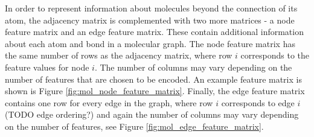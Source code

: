 In order to represent information about molecules beyond the connection of its atom, the adjacency matrix is complemented with two more matrices - a node feature matrix and an edge feature matrix. These contain additional information about each atom and bond in a molecular graph. The node feature matrix has the same number of rows as the adjacency matrix, where row $i$ corresponds to the feature values for node $i$. The number of columns may vary depending on the number of features that are chosen to be encoded. An example feature matrix is shown is Figure \ref{fig:mol_node_feature_matrix}. Finally, the edge feature matrix contains one row for every edge in the graph, where row $i$ corresponds to edge $i$ (TODO edge ordering?) and again the number of columns may vary depending on the number of features, see Figure \ref{fig:mol_edge_feature_matrix}.

